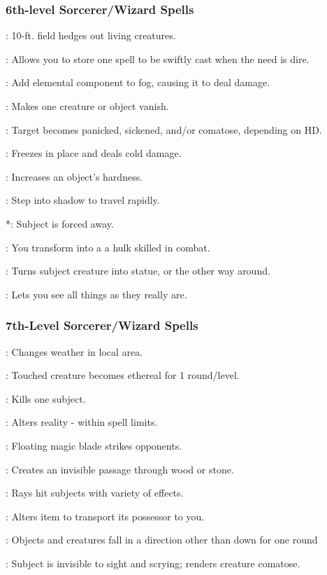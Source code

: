 \subsubsection{6th-level Sorcerer/Wizard Spells}
\begin{list}{}{\leftmargin=1em}
\item {}: 10-ft. field hedges out living creatures.
\item {}: Allows you to store one spell to be swiftly cast when the need is dire.
\item {}: Add elemental component to fog, causing it to deal damage.
\item {}: Makes one creature or object vanish.
\item {}: Target becomes panicked, sickened, and/or comatose, depending on HD.
\item {}: Freezes in place and deals cold damage.
\item {}: Increases an object's hardness.
\item {}: Step into shadow to travel rapidly.
\item {}*: Subject is forced away.
\item {}: You transform into a a hulk skilled in combat.
\item {}: Turns subject creature into statue, or the other way around.
\item {}: Lets you see all things as they really are.
\end{list}
\subsubsection{7th-Level Sorcerer/Wizard Spells}
\begin{list}{}{\leftmargin=1em}
\item {}: Changes weather in local area.
\item {}: Touched creature becomes ethereal for 1 round/level.
\item {}: Kills one subject.
\item {}: Alters reality - within spell limits.
\item {}: Floating magic blade strikes opponents.
\item {}: Creates an invisible passage through wood or stone.
\item {}: Rays hit subjects with variety of effects.
\item {}: Alters item to transport its possessor to you.
\item {}: Objects and creatures fall in a direction other than down for one round
\item {}: Subject is invisible to sight and scrying; renders creature comatose.
\end{list}
